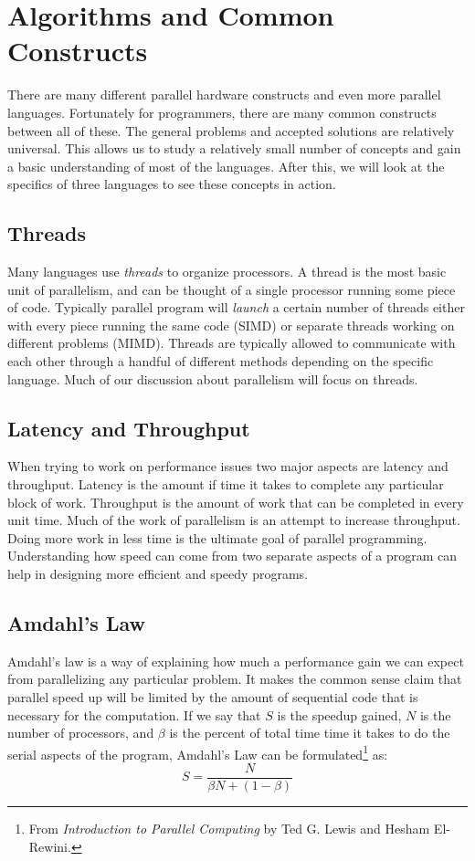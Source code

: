 \documentclass{article}
\begin{document}
  \section{Algorithms and Common Constructs}
  There are many different parallel hardware constructs and even more parallel languages. Fortunately for programmers, there are many common constructs between all of these. The general problems and accepted solutions are relatively universal. This allows us to study a relatively small number of concepts and gain a basic understanding of most of the languages. After this, we will look at the specifics of three languages to see these concepts in action.
	\subsection{Threads}
	Many languages use \emph{threads} to organize processors. A thread is the most basic unit of parallelism, and can be thought of a single processor running some piece of code. Typically parallel program will \emph{launch} a certain number of threads either with every piece running the same code (SIMD) or separate threads working on different problems (MIMD). Threads are typically allowed to communicate with each other through a handful of different methods depending on the specific language. Much of our discussion about parallelism will focus on threads.
	
	\subsection{Latency and Throughput}
    When trying to work on performance issues two major aspects are latency and throughput. Latency is the amount if time it takes to complete any particular block of work. Throughput is the amount of work that can be completed in every unit time. Much of the work of parallelism is an attempt to increase throughput. Doing more work in less time is the ultimate goal of parallel programming. Understanding how speed can come from two separate aspects of a program can help in designing more efficient and speedy programs.
	
	\subsection{Amdahl's Law}
    Amdahl's law is a way of explaining how much a performance gain we can expect from parallelizing any particular problem. It makes the common sense claim that parallel speed up will be limited by the amount of sequential code that is necessary for the computation. If we say that $S$ is the speedup gained, $N$ is the number of processors, and $\beta$ is the percent of total time time it takes to do the serial aspects of the program, Amdahl's Law can be formulated\footnote{From {\it Introduction to Parallel Computing} by Ted G. Lewis and Hesham El-Rewini.} as:
    $$S=\frac{N}{\beta N+(1-\beta)}$$
\end{document}
